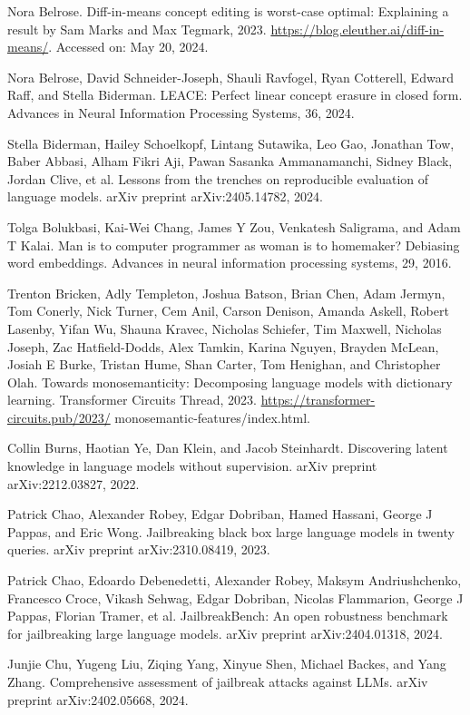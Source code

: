 \documentclass[10pt]{article}
\begin{document}
Nora Belrose. Diff-in-means concept editing is worst-case optimal: Explaining a result by Sam Marks and Max Tegmark, 2023. \href{https://blog.eleuther.ai/diff-in-means/}{https://blog.eleuther.ai/diff-in-means/}. Accessed on: May 20, 2024.

Nora Belrose, David Schneider-Joseph, Shauli Ravfogel, Ryan Cotterell, Edward Raff, and Stella Biderman. LEACE: Perfect linear concept erasure in closed form. Advances in Neural Information Processing Systems, 36, 2024.

Stella Biderman, Hailey Schoelkopf, Lintang Sutawika, Leo Gao, Jonathan Tow, Baber Abbasi, Alham Fikri Aji, Pawan Sasanka Ammanamanchi, Sidney Black, Jordan Clive, et al. Lessons from the trenches on reproducible evaluation of language models. arXiv preprint arXiv:2405.14782, 2024.

Tolga Bolukbasi, Kai-Wei Chang, James Y Zou, Venkatesh Saligrama, and Adam T Kalai. Man is to computer programmer as woman is to homemaker? Debiasing word embeddings. Advances in neural information processing systems, 29, 2016.

Trenton Bricken, Adly Templeton, Joshua Batson, Brian Chen, Adam Jermyn, Tom Conerly, Nick Turner, Cem Anil, Carson Denison, Amanda Askell, Robert Lasenby, Yifan Wu, Shauna Kravec, Nicholas Schiefer, Tim Maxwell, Nicholas Joseph, Zac Hatfield-Dodds, Alex Tamkin, Karina Nguyen, Brayden McLean, Josiah E Burke, Tristan Hume, Shan Carter, Tom Henighan, and Christopher Olah. Towards monosemanticity: Decomposing language models with dictionary learning. Transformer Circuits Thread, 2023. \href{https://transformer-circuits.pub/2023/}{https://transformer-circuits.pub/2023/} monosemantic-features/index.html.

Collin Burns, Haotian Ye, Dan Klein, and Jacob Steinhardt. Discovering latent knowledge in language models without supervision. arXiv preprint arXiv:2212.03827, 2022.

Patrick Chao, Alexander Robey, Edgar Dobriban, Hamed Hassani, George J Pappas, and Eric Wong. Jailbreaking black box large language models in twenty queries. arXiv preprint arXiv:2310.08419, 2023.

Patrick Chao, Edoardo Debenedetti, Alexander Robey, Maksym Andriushchenko, Francesco Croce, Vikash Sehwag, Edgar Dobriban, Nicolas Flammarion, George J Pappas, Florian Tramer, et al. JailbreakBench: An open robustness benchmark for jailbreaking large language models. arXiv preprint arXiv:2404.01318, 2024.

Junjie Chu, Yugeng Liu, Ziqing Yang, Xinyue Shen, Michael Backes, and Yang Zhang. Comprehensive assessment of jailbreak attacks against LLMs. arXiv preprint arXiv:2402.05668, 2024.
\end{document}
